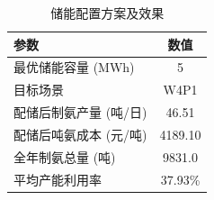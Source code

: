 \begin{table}[H]
\centering
\caption{储能配置方案及效果}
\begin{tabular}{lc}
\toprule
参数 & 数值 \\
\midrule
最优储能容量 (MWh) & 5 \\
目标场景 & W4P1 \\
配储后制氨产量 (吨/日) & 46.51 \\
配储后吨氨成本 (元/吨) & 4189.10 \\
全年制氨总量 (吨) & 9831.0 \\
平均产能利用率 & 37.93\% \\
\bottomrule
\end{tabular}
\end{table}